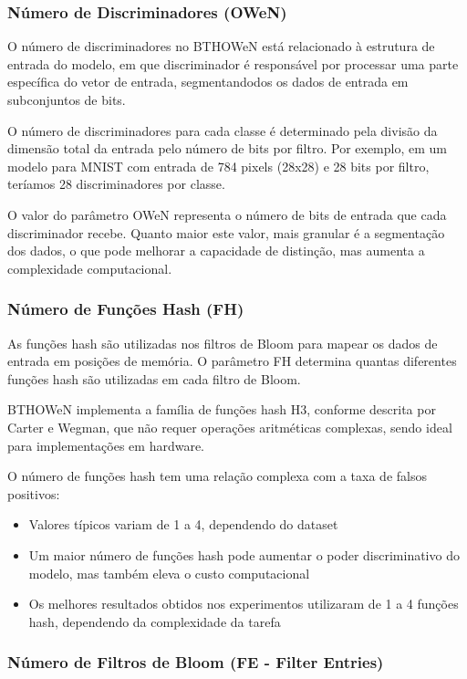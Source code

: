 \documentclass{article}
\begin{document}
\subsubsection{Número de Discriminadores (OWeN)}

O número de discriminadores no BTHOWeN está relacionado à estrutura de entrada do modelo, em que discriminador é responsável por processar uma parte específica do vetor de entrada, segmentandodos os dados de entrada em subconjuntos de bits. 

O número de discriminadores para cada classe é determinado pela divisão da dimensão total da entrada pelo número de bits por filtro. Por exemplo, em um modelo para MNIST com entrada de 784 pixels (28x28) e 28 bits por filtro, teríamos 28 discriminadores por classe.

O valor do parâmetro OWeN representa o número de bits de entrada que cada discriminador recebe. Quanto maior este valor, mais granular é a segmentação dos dados, o que pode melhorar a capacidade de distinção, mas aumenta a complexidade computacional.

\subsubsection{Número de Funções Hash (FH)}

As funções hash são utilizadas nos filtros de Bloom para mapear os dados de entrada em posições de memória. O parâmetro FH determina quantas diferentes funções hash são utilizadas em cada filtro de Bloom.

BTHOWeN implementa a família de funções hash H3, conforme descrita por Carter e Wegman, que não requer operações aritméticas complexas, sendo ideal para implementações em hardware.

O número de funções hash tem uma relação complexa com a taxa de falsos positivos:
\begin{itemize}
    \item Valores típicos variam de 1 a 4, dependendo do dataset
    \item Um maior número de funções hash pode aumentar o poder discriminativo do modelo, mas também eleva o custo computacional
    \item Os melhores resultados obtidos nos experimentos utilizaram de 1 a 4 funções hash, dependendo da complexidade da tarefa
\end{itemize}

\subsubsection{Número de Filtros de Bloom (FE - Filter Entries)}
\end{document}
